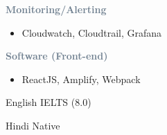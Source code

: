 \textcolor{SlateGrey}{\textbf{Monitoring/Alerting}}
\newline

\begin{itemize}
    \item Cloudwatch, Cloudtrail, Grafana
\end{itemize}

\textcolor{SlateGrey}{\textbf{Software (Front-end)}}
\newline

\begin{itemize}
    \item ReactJS, Amplify, Webpack
\end{itemize}




    English \hfill IELTS (8.0) 

\divider

Hindi \hfill Native




